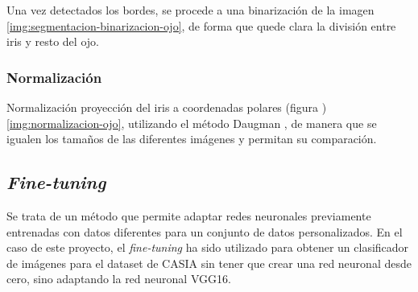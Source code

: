 

Una vez detectados los bordes, se procede a una binarización de la imagen \ref{img:segmentacion-binarizacion-ojo}, de forma que quede clara la división entre iris y resto del ojo.



\subsubsection{Normalización}

Normalización proyección del iris a coordenadas polares (figura )\ref{img:normalizacion-ojo}, utilizando el método Daugman \cite{daugman_normalization_1993}, de manera que se igualen los tamaños de las diferentes imágenes y permitan su comparación.



\subsection{\textit{Fine-tuning}}
 Se trata de un método que permite adaptar redes neuronales previamente entrenadas con datos diferentes para un conjunto de datos personalizados. En el caso de este proyecto,
 el \textit{fine-tuning} ha sido utilizado para obtener un clasificador de imágenes para el dataset de CASIA sin tener que crear una red neuronal desde cero, sino adaptando la red
  neuronal VGG16.


